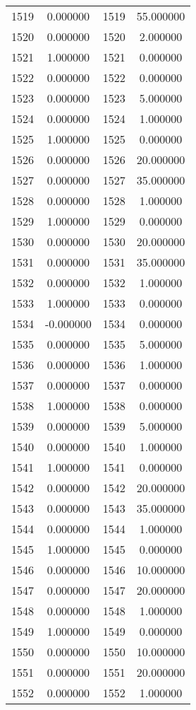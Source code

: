 \documentclass[12pt]{article}
\begin{document}
\begin{longtable}{@{}cccc@{}}
1519 & 0.000000 & 1519 & 55.000000 \\
1520 & 0.000000 & 1520 & 2.000000 \\
1521 & 1.000000 & 1521 & 0.000000 \\
1522 & 0.000000 & 1522 & 0.000000 \\
1523 & 0.000000 & 1523 & 5.000000 \\
1524 & 0.000000 & 1524 & 1.000000 \\
1525 & 1.000000 & 1525 & 0.000000 \\
1526 & 0.000000 & 1526 & 20.000000 \\
1527 & 0.000000 & 1527 & 35.000000 \\
1528 & 0.000000 & 1528 & 1.000000 \\
1529 & 1.000000 & 1529 & 0.000000 \\
1530 & 0.000000 & 1530 & 20.000000 \\
1531 & 0.000000 & 1531 & 35.000000 \\
1532 & 0.000000 & 1532 & 1.000000 \\
1533 & 1.000000 & 1533 & 0.000000 \\
1534 & -0.000000 & 1534 & 0.000000 \\
1535 & 0.000000 & 1535 & 5.000000 \\
1536 & 0.000000 & 1536 & 1.000000 \\
1537 & 0.000000 & 1537 & 0.000000 \\
1538 & 1.000000 & 1538 & 0.000000 \\
1539 & 0.000000 & 1539 & 5.000000 \\
1540 & 0.000000 & 1540 & 1.000000 \\
1541 & 1.000000 & 1541 & 0.000000 \\
1542 & 0.000000 & 1542 & 20.000000 \\
1543 & 0.000000 & 1543 & 35.000000 \\
1544 & 0.000000 & 1544 & 1.000000 \\
1545 & 1.000000 & 1545 & 0.000000 \\
1546 & 0.000000 & 1546 & 10.000000 \\
1547 & 0.000000 & 1547 & 20.000000 \\
1548 & 0.000000 & 1548 & 1.000000 \\
1549 & 1.000000 & 1549 & 0.000000 \\
1550 & 0.000000 & 1550 & 10.000000 \\
1551 & 0.000000 & 1551 & 20.000000 \\
1552 & 0.000000 & 1552 & 1.000000 \\

\end{longtable}
\end{document}

